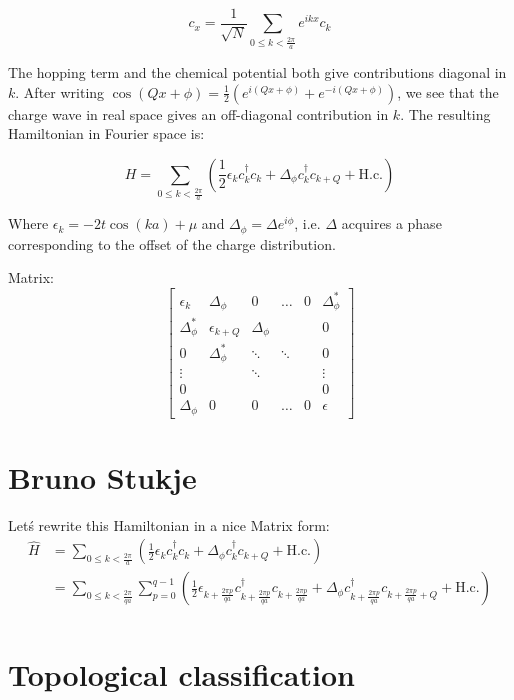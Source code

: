 \documentclass[letterpaper, 10 pt, conference]{ieeeconf}  %
\begin{document}
$$c_x = \frac{1}{\sqrt{N}}\sum_{0 \leq k < \frac{2\pi}{a}}e^{ikx}c_k$$

The hopping term and the chemical potential both give contributions diagonal in $k$. After writing $\cos(Qx + \phi) = \frac{1}{2}(e^{i(Qx + \phi)} + e^{-i(Qx + \phi)}) $, we see that the charge wave in real space gives an off-diagonal contribution in $k$. The resulting Hamiltonian in Fourier space is:

$$ H = \sum_{0 \leq k < \frac{2\pi}{a}} (\frac{1}{2}\epsilon_k c_k^{\dagger}c_k + \Delta_\phi c_k^{\dagger}c_{k+Q} + \text{H.c.}) $$

Where $\epsilon_k = -2t \cos(ka) + \mu $ and $\Delta_\phi = \Delta e^{i\phi}$, i.e. $\Delta$ acquires a phase corresponding to the offset of the charge distribution.

Matrix:
$$
\begin{bmatrix}
\epsilon_k       & \Delta_\phi     & 0      & \hdots       & 0     & \Delta_\phi^*  \\
\Delta_\phi^*    & \epsilon_{k+Q} & \Delta_\phi &  &        & 0 \\
0               & \Delta_\phi^* & \ddots & \ddots  & & 0   \\
\vdots   &  & \ddots &  &  &   \vdots \\
0 &        &  &  &  & 0 \\
\Delta_\phi & 0 & 0     & \hdots             & 0      & \epsilon
\end{bmatrix}
$$

\section{Bruno Stukje}
Let\'s rewrite this Hamiltonian in a nice Matrix form:
\begin{align*}
\hat{H} &= \sum_{0 \leq k < \frac{2\pi}{a}} (\frac{1}{2}\epsilon_k c_k^{\dagger}c_k + \Delta_\phi c_k^{\dagger}c_{k+Q} + \text{H.c.})\\
&=\sum_{0 \leq k < \frac{2\pi}{qa}} \sum_{p=0}^{q-1}  (\frac{1}{2}\epsilon_{k+\frac{2\pi p}{qa}} c_{k+\frac{2\pi p}{qa}}^{\dagger}c_{k+\frac{2\pi p}{qa}} + \Delta_\phi c_{k+\frac{2\pi p}{qa}}^{\dagger}c_{k+\frac{2\pi p}{qa}+Q} + \text{H.c.})\\
\end{align*}

\section{Topological classification}
\end{document}
